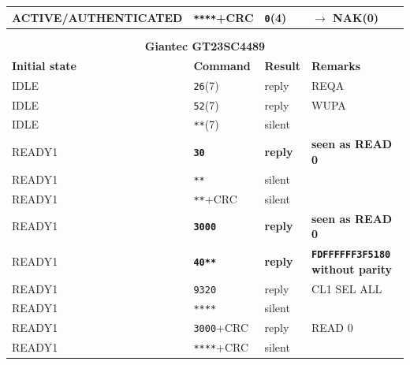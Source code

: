 \begin{longtable}{l l l l}
ACTIVE/AUTHENTICATED & \texttt{****}+CRC                   & \texttt{0}(4)            & $\rightarrow$ NAK(0)                        \\
\hline \\
\newpage
\multicolumn{4}{l}{}                                                                                              \\
\multicolumn{4}{c}{\textbf{Giantec GT23SC4489}}                                                                              \\
\hline
\textbf{Initial state} & \textbf{Command} & \textbf{Result} & \textbf{Remarks} \\
\hline
IDLE                 & \texttt{26}(7)                      & reply           & REQA                                        \\
IDLE                 & \texttt{52}(7)                      & reply           & WUPA                                        \\
IDLE                 & \texttt{**}(7)                      & silent          &                                             \\
READY1               & \textbf{\texttt{30}}                & \textbf{reply}  & \textbf{seen as READ 0}                     \\
READY1               & \texttt{**}                         & silent          &                                             \\
READY1               & \texttt{**}+CRC                     & silent          &                                             \\
READY1               & \textbf{\texttt{3000}}              & \textbf{reply}  & \textbf{seen as READ 0}                     \\
READY1               & \textbf{\texttt{40**}}              & \textbf{reply}  & \textbf{\texttt{FDFFFFFF3F5180} without parity}      \\
READY1               & \texttt{9320}                       & reply           & CL1 SEL ALL                                 \\
READY1               & \texttt{****}                       & silent          &                                             \\
READY1               & \texttt{3000}+CRC                   & reply           & READ 0                                      \\
READY1               & \texttt{****}+CRC                   & silent          &                                             \\

\end{longtable}
